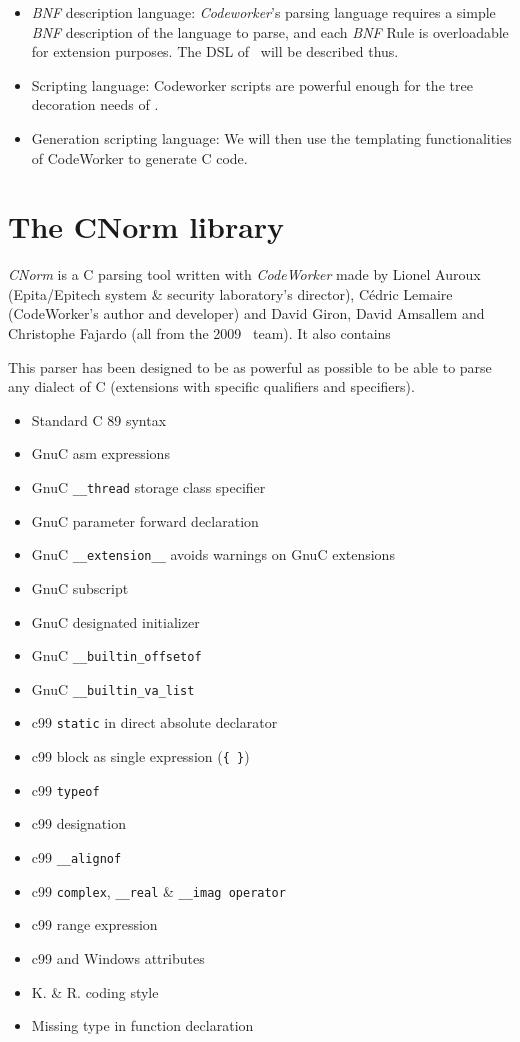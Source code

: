 \documentclass[american]{rtxreport}
\begin{document}
\begin{itemize}
    \item \emph{BNF} description language: \emph{Codeworker}'s parsing language
        requires a simple \emph{BNF} description of the language to parse, and
        each \emph{BNF} Rule is overloadable for extension purposes. The DSL of
        \rtx\ will be described thus.
    \item Scripting language: Codeworker scripts are
        powerful enough for the tree decoration needs of \rtx.
    \item Generation scripting language: We will then use the templating
        functionalities of CodeWorker to generate C code.
\end{itemize}



\section{The CNorm library}

\emph{CNorm} is a C parsing tool written with \emph{CodeWorker} made by Lionel
Auroux (Epita/Epitech system \& security laboratory's director), Cédric Lemaire
(CodeWorker's author and developer) and David Giron, David Amsallem and
Christophe Fajardo (all from the 2009 \rtx\ team). It also contains

This parser has been designed to be as powerful as possible to be able to
parse any dialect of C (extensions with specific qualifiers and specifiers).

\begin{itemize}
    \item Standard C 89 syntax
    \item GnuC asm expressions
    \item GnuC \texttt{\_\_thread} storage class specifier
    \item GnuC parameter forward declaration
    \item GnuC \texttt{\_\_extension\_\_} avoids warnings on GnuC extensions
    \item GnuC subscript
    \item GnuC designated initializer
    \item GnuC \texttt{\_\_builtin\_offsetof}
    \item GnuC \texttt{\_\_builtin\_va\_list}
    \item c99 \texttt{static} in direct absolute declarator
    \item c99 block as single expression (\texttt{\{ \}})
    \item c99 \texttt{typeof}
    \item c99 designation
    \item c99 \texttt{\_\_alignof}
    \item c99 \texttt{complex}, \texttt{\_\_real} \& \texttt{\_\_imag operator}
    \item c99 range expression
    \item c99 and Windows attributes
    \item K. \& R. coding style
    \item Missing type in function declaration
\end{itemize}
\end{document}
